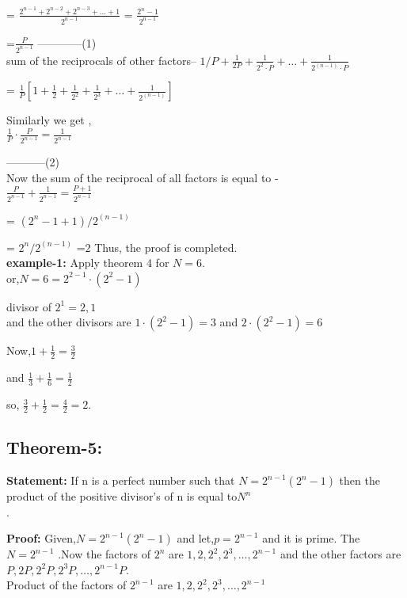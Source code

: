 \documentclass[12pt,,a4paper]{article}
\begin{document}
= $\frac{{2^{n-1} + 2^{n-2} + 2^{n-3} + \ldots + 1}}{{2^{n-1}}}$
= $\frac{{2^n - 1}}{{2^{n-1}}}$

=$\frac{P}{2^{n-1}}$
------------(1)\\
\vspace{10pt}
sum of the reciprocals of other factors--
$1/P + \frac{1}{2P} + \frac{1}{2^2 \cdot P} + \ldots + \frac{1}{2^{(n-1)} \cdot P}$

= $\frac{1}{P}\left[1 + \frac{1}{2} + \frac{1}{2^2} + \frac{1}{2^3} + \ldots + \frac{1}{2^{(n-1)}}\right]$

Similarly we get , \\
$\frac{1}{P} \cdot \frac{P}{2^{n-1}} = \frac{1}{2^{n-1}}$

-----------(2)\\
Now the sum of the reciprocal of all factors is equal to -\\
$\frac{P}{2^{n-1}} + \frac{1}{2^{n-1}} = \frac{P+1}{2^{n-1}}$

= \((2^n - 1 + 1) / 2^{(n - 1)}\)

= \(2^n / 2^{(n-1)}\)
=\(2\)
Thus, the proof is completed.\\

\textbf{example-1:} Apply theorem 4 for \(N = 6\).\\
or,\(N = 6 = 2^{2-1} \cdot (2^2 - 1)\)

divisor of  \(2^1 = 2{,}1\) \\
and the other divisors are \(1 \cdot (2^2 - 1) = 3\)
 and \(2 \cdot (2^2 - 1) = 6\)

Now,\(1 + \frac{1}{2} = \frac{3}{2}\)

and \(\frac{1}{3} + \frac{1}{6} = \frac{1}{2}\)

so,  \(\frac{3}{2} + \frac{1}{2} = \frac{4}{2} = 2\).\\

\subsection*{Theorem-5:}
\textbf{Statement:}  If n is a perfect number such that \(N = 2^{n-1}(2^n-1)\)
 then the product of the positive divisor's of n is equal to\(N^n\) \\
.

\textbf{Proof:}  Given,\(N = 2^{n-1}(2^n-1)\)  and let,\(p = 2^{n-1}\) and it is prime. The \(N = 2^{n-1}\)
 .Now the factors of \(2^n\) are \(1, 2, 2^2, 2^3, \ldots, 2^{n-1}\) and  the other factors are \(P, 2P, 2^2P, 2^3P, \ldots, 2^{n-1}P\). \\
Product of the factors  of \(2^{n-1}\) are  \(1, 2, 2^2, 2^3, \ldots, 2^{n-1}\)
\end{document}
